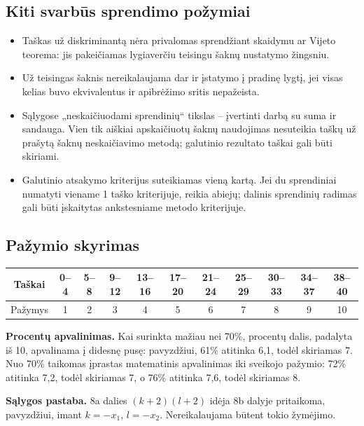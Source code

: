 \documentclass[11pt,a4paper]{article}
\begin{document}
\subsection*{Kiti svarbūs sprendimo požymiai}
\begin{itemize}
\item Taškas už diskriminantą nėra privalomas sprendžiant skaidymu ar Vijeto teorema: jis pakeičiamas lygiaverčiu teisingu šaknų nustatymo žingsniu.
\item Už teisingas šaknis nereikalaujama dar ir įstatymo į pradinę lygtį, jei visas kelias buvo ekvivalentus ir apibrėžimo sritis nepažeista.
\item Sąlygose „neskaičiuodami sprendinių“ tikslas -- įvertinti darbą su suma ir sandauga. Vien tik aiškiai apskaičiuotų šaknų naudojimas nesuteikia taškų už prašytą šaknų neskaičiavimo metodą; galutinio rezultato taškai gali būti skiriami.
\item Galutinio atsakymo kriterijus suteikiamas vieną kartą. Jei du sprendiniai numatyti viename 1 taško kriterijuje, reikia abiejų; dalinis sprendinių radimas gali būti įskaitytas ankstesniame metodo kriterijuje.
\end{itemize}

\subsection*{Pažymio skyrimas}
\begin{center}\small
\begin{tabular}{|c|*{10}{c|}}\hline
Taškai&0--4&5--8&9--12&13--16&17--20&21--24&25--29&30--33&34--37&38--40\\\hline
Pažymys&1&2&3&4&5&6&7&8&9&10\\\hline
\end{tabular}\end{center}

\textbf{Procentų apvalinimas.} Kai surinkta mažiau nei 70\%, procentų dalis, padalyta iš 10, apvalinama į didesnę pusę: pavyzdžiui, 61\% atitinka 6,1, todėl skiriamas 7. Nuo 70\% taikomas įprastas matematinis apvalinimas iki sveikojo pažymio: 72\% atitinka 7,2, todėl skiriamas 7, o 76\% atitinka 7,6, todėl skiriamas 8.

\textbf{Sąlygos pastaba.} 8a dalies $(k+2)(l+2)$ idėja 8b dalyje pritaikoma, pavyzdžiui, imant $k=-x_1$, $l=-x_2$. Nereikalaujama būtent tokio žymėjimo.
\newpage
\end{document}
